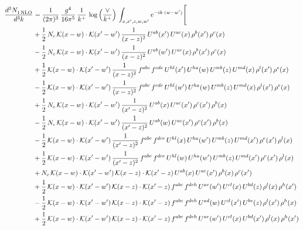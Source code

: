 \documentclass[9pt]{article}
\numberwithin{equation}{section}
\begin{document}
\begin{align}
    \frac{d^{3}N_{1\,\rm NLO}^{\rm}}{d^{3}k}  & = \frac{1}{(2\pi)^{3}}\,\frac{g^{4}}{16\pi^{5}}\,\frac{1}{k^{+}}\,\log{\left(\frac{\vee}{k^{+}}\right)}\, \int_{x,x',z,w,w'}e^{-ik\cdot (w-w')}\Bigg[\notag\\ &+\frac{1}{2}\,N_{c}\,\mathcal{K}(x-w)\cdot\mathcal{K}(x'-w')\,\frac{1}{(x-z)^{2}}\,U^{ab}(x')\,U^{ac}(x)\,\rho^{b}(x')\,\rho^{c}(x)\notag \\ 
&-\frac{1}{2}\,N_{c}\,\mathcal{K}(x-w)\cdot\mathcal{K}(x'-w')\,\frac{1}{(x-z)^{2}}\,U^{ab}(w')\,U^{ac}(x)\,\rho^{b}(x')\,\rho^{c}(x)\notag \\ 
&+\frac{1}{2}\,\mathcal{K}(x-w)\cdot\mathcal{K}(x'-w')\,\frac{1}{(x-z)^{2}}\,f^{abc}\,f^{cde}\,U^{hl}(x')\,U^{ha}(w)\,U^{mb}(z)\,U^{md}(x)\,\rho^{l}(x')\,\rho^{e}(x)\notag \\ 
&-\frac{1}{2}\,\mathcal{K}(x-w)\cdot\mathcal{K}(x'-w')\,\frac{1}{(x-z)^{2}}\,f^{abc}\,f^{cde}\,U^{hl}(w')\,U^{ha}(w)\,U^{mb}(z)\,U^{md}(x)\,\rho^{l}(x')\,\rho^{e}(x)\notag \\ 
&+\frac{1}{2}\,N_{c}\,\mathcal{K}(x-w)\cdot\mathcal{K}(x'-w')\,\frac{1}{(x'-z)^{2}}\,U^{ab}(x)\,U^{ac}(x')\,\rho^{c}(x')\,\rho^{b}(x)\notag \\ 
&-\frac{1}{2}\,N_{c}\,\mathcal{K}(x-w)\cdot\mathcal{K}(x'-w')\,\frac{1}{(x'-z)^{2}}\,U^{ab}(w)\,U^{ac}(x')\,\rho^{c}(x')\,\rho^{b}(x)\notag \\ 
&-\frac{1}{2}\,\mathcal{K}(x-w)\cdot\mathcal{K}(x'-w')\,\frac{1}{(x'-z)^{2}}\,f^{abc}\,f^{dce}\,U^{hl}(x)\,U^{ha}(w')\,U^{mb}(z)\,U^{md}(x')\,\rho^{e}(x')\,\rho^{l}(x)\notag \\ 
&+\frac{1}{2}\,\mathcal{K}(x-w)\cdot\mathcal{K}(x'-w')\,\frac{1}{(x'-z)^{2}}\,f^{abc}\,f^{dce}\,U^{hl}(w)\,U^{ha}(w')\,U^{mb}(z)\,U^{md}(x')\,\rho^{e}(x')\,\rho^{l}(x)\notag \\ 
&+N_{c}\,\mathcal{K}(x-w)\cdot\mathcal{K}(x'-w')\,\mathcal{K}(x-z)\cdot\mathcal{K}(x'-z)\,U^{ab}(x)\,U^{ac}(x')\,\rho^{b}(x)\,\rho^{c}(x')\notag \\ 
&+\frac{1}{2}\,\mathcal{K}(x-w)\cdot\mathcal{K}(x'-w')\,\mathcal{K}(x-z)\cdot\mathcal{K}(x'-z)\,f^{abc}\,f^{deh}\,U^{ae}(w')\,U^{cl}(x)\,U^{bd}(z)\,\rho^{l}(x)\,\rho^{h}(x')\notag \\ 
&-\frac{1}{2}\,\mathcal{K}(x-w)\cdot\mathcal{K}(x'-w')\,\mathcal{K}(x-z)\cdot\mathcal{K}(x'-z)\,f^{abc}\,f^{deh}\,U^{ad}(w)\,U^{cl}(x')\,U^{be}(z)\,\rho^{l}(x')\,\rho^{h}(x)\notag \\ 
&+\frac{1}{2}\,\mathcal{K}(x-w)\cdot\mathcal{K}(x'-w')\,\mathcal{K}(x-z)\cdot\mathcal{K}(x'-z)\,f^{abc}\,f^{deh}\,U^{ae}(w')\,U^{cl}(x)\,U^{bd}(x')\,\rho^{l}(x)\,\rho^{h}(x')\notag \\ 

\end{align}
\end{document}
